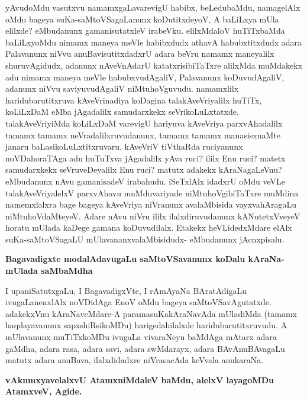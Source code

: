 yAvudoMdu vasutxvu namamxgaLavarevigU habibx, beLedubaMdu, namagelAlx oMdu bageya suKa-saMtoVSagaLanunx koDutitxdeyoV, A baLiLxya mUla elilxde? eMbudanunx gamanisutatxleV irabeVku. elilxMdaloV huTiTxbaMda baLiLxyoMdu nimamx maneya meVle habibxdudx athavA habubxtitxdudx adara Palavanunx niVvu anuBavisutitxdadxrU adara beVru namamx maneyalilx shuruvAgidudx, adanunx nAveVnAdarU katatxrisibiTaTxre alilxMda muMdakekx adu nimamx maneya meVle habubxvudAgaliV, Palavanunx koDuvudAgaliV, adanunx niVvu saviyuvudAgaliV niMtuhoVguvudu. namamxlilx haridubarutitxruva kAveVrinadiya koDagina talakAveVriyalilx huTiTx, koLiLxDaM eMba jAgadalilx samudarxkekx seVrikoLuLxtatxde. talakAveVriyiMda koLiLxDaM varevigU hariyuva kAveVriya parxvAhadalilx tamamx tamamx neVradalilxruvudanunx, tamamx tamamx manasisxnaMte janaru baLasikoLuLxtitxruvaru. kAveVriV tiVthaRda ruciyanunx noVDahoraTAga adu huTuTxva jAgadalilx yAva ruci? ililx Enu ruci? matetx samudarxkekx seVruveDeyalilx Enu ruci? matutx adakekx kAraNagaLeVnu? eMbudanunx nAvu gamanisadeV irabahudu. iSeTxlAlx idadxrU oMdu veVLe talakAveVriyalelxV parxvAhavu muMduvariyade niMtuhoVgibiTaTxre muMdina namemxlalxra bage bageya kAveVriya niVranunx avalaMbisida vayxvahAragaLu niMtuhoVdaMteyeV. Adare nAvu niVru ililx ilalxdiruvudanunx kANutetxVveyeV horatu mUlada kaDege gamana koDuvudilalx. Etakekx heVLidedxMdare elAlx suKa-saMtoVSagaLU mUlavananxvalaMbisidudx- eMbudanunx jAcnxpisalu.

\noindent
{\bf\large{Bagavadigxte modalAdavugaLu saMtoVSavanunx koDalu kAraNa-mUlada saMbaMdha}}\label{page195}

I upaniSatutxgaLu, I BagavadigxVte, I rAmAyaNa BAratAdigaLu ivugaLanenxlAlx noVDidAga EnoV oMdu bageya saMtoVSavAgutatxde. adakekxVnu kAraNaveMdare-A paramasuKakAraNavAda mUladiMda (tamamx haqdayavanunx sapxshiRsikoMDu) harigedahilalxde haridubarutitxruvudu. A mUlavanunx muTiTxkoMDu ivugaLa vivaraNeyu baMdAga mAtarx adara gaMdha, adara rasa, adara savi, adara swMdarayx, adara BAvAnuBAvagaLu matutx adara anuBava, ilalxdidadxre niVrasacAda keVvala anukaraNa.

\noindent
{\bf\large{vAknmxyavelalxvU AtamxniMdaleV baMdu, alelxV layagoMDu AtamxveV, Agide.}}\label{195}

